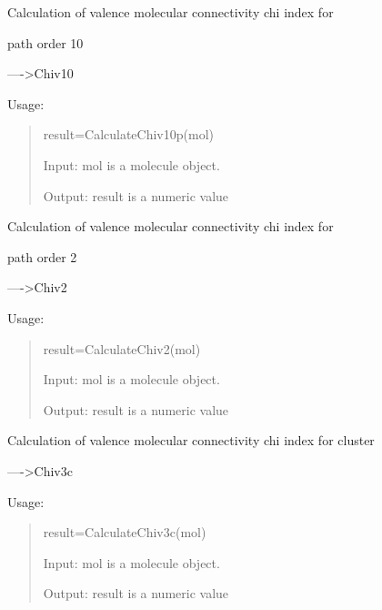 \documentclass[letterpaper,10pt,english]{sphinxmanual}
\begin{document}

\begin{fulllineitems}
\label{reference/connectivity:connectivity.CalculateChiv10p}
Calculation of valence molecular connectivity chi index for

path order 10

----\textgreater{}Chiv10

Usage:
\begin{quote}

result=CalculateChiv10p(mol)

Input: mol is a molecule object.

Output: result is a numeric value
\end{quote}

\end{fulllineitems}


\begin{fulllineitems}
\label{reference/connectivity:connectivity.CalculateChiv2}
Calculation of valence molecular connectivity chi index for

path order 2

----\textgreater{}Chiv2

Usage:
\begin{quote}

result=CalculateChiv2(mol)

Input: mol is a molecule object.

Output: result is a numeric value
\end{quote}

\end{fulllineitems}


\begin{fulllineitems}
\label{reference/connectivity:connectivity.CalculateChiv3c}
Calculation of valence molecular connectivity chi index for cluster

----\textgreater{}Chiv3c

Usage:
\begin{quote}

result=CalculateChiv3c(mol)

Input: mol is a molecule object.

Output: result is a numeric value
\end{quote}

\end{fulllineitems}
\end{document}
